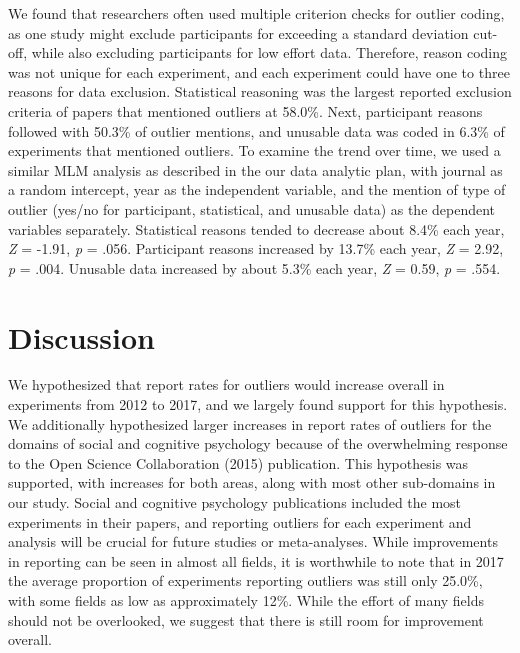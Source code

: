 \documentclass[english,man]{apa6}
\theoremstyle{definition}
\theoremstyle{definition}
\theoremstyle{definition}
\theoremstyle{remark}
\begin{document}
We found that researchers often used multiple criterion checks for
outlier coding, as one study might exclude participants for exceeding a
standard deviation cut-off, while also excluding participants for low
effort data. Therefore, reason coding was not unique for each
experiment, and each experiment could have one to three reasons for data
exclusion. Statistical reasoning was the largest reported exclusion
criteria of papers that mentioned outliers at 58.0\%. Next, participant
reasons followed with 50.3\% of outlier mentions, and unusable data was
coded in 6.3\% of experiments that mentioned outliers. To examine the
trend over time, we used a similar MLM analysis as described in the our
data analytic plan, with journal as a random intercept, year as the
independent variable, and the mention of type of outlier (yes/no for
participant, statistical, and unusable data) as the dependent variables
separately. Statistical reasons tended to decrease about 8.4\% each
year, \emph{Z} = -1.91, \emph{p} = .056. Participant reasons increased
by 13.7\% each year, \emph{Z} = 2.92, \emph{p} = .004. Unusable data
increased by about 5.3\% each year, \emph{Z} = 0.59, \emph{p} = .554.

\section{Discussion}\label{discussion}

We hypothesized that report rates for outliers would increase overall in
experiments from 2012 to 2017, and we largely found support for this
hypothesis. We additionally hypothesized larger increases in report
rates of outliers for the domains of social and cognitive psychology
because of the overwhelming response to the Open Science Collaboration
(2015) publication. This hypothesis was supported, with increases for
both areas, along with most other sub-domains in our study. Social and
cognitive psychology publications included the most experiments in their
papers, and reporting outliers for each experiment and analysis will be
crucial for future studies or meta-analyses. While improvements in
reporting can be seen in almost all fields, it is worthwhile to note
that in 2017 the average proportion of experiments reporting outliers
was still only 25.0\%, with some fields as low as approximately 12\%.
While the effort of many fields should not be overlooked, we suggest
that there is still room for improvement overall.
\end{document}
